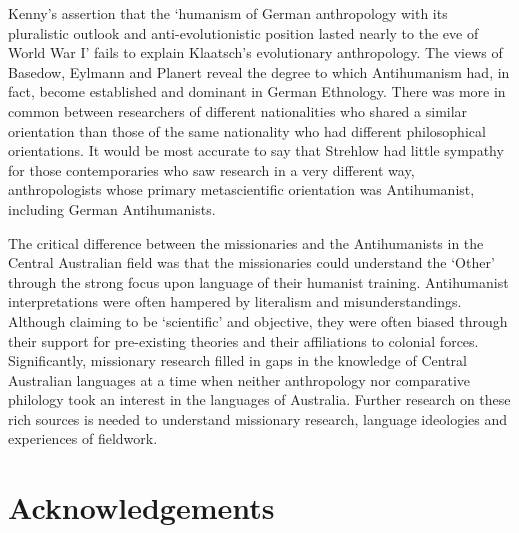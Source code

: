\documentclass[output=paper]{langsci/langscibook}
\begin{document}
Kenny’s assertion that the ‘humanism of German anthropology with its pluralistic outlook and anti-evolutionistic position lasted nearly to the eve of World War I’ fails to explain Klaatsch’s evolutionary anthropology. The views of Basedow, Eylmann and Planert reveal the degree to which Antihumanism had, in fact, become established and dominant in German Ethnology. There was more in common between researchers of different nationalities who shared a similar orientation than those of the same nationality who had different philosophical orientations.  It would be most accurate to say that Strehlow had little sympathy for those contemporaries who saw research in a very different way, anthropologists whose primary metascientific orientation was Antihumanist, including German Antihumanists. 

The critical difference between the missionaries and the Antihumanists in the Central Australian field was that the missionaries could understand the ‘Other’ through the strong focus upon language of their humanist training. Antihumanist interpretations were often hampered by literalism and misunderstandings. Although claiming to be ‘scientific’ and objective, they were often biased through their support for pre-existing theories and their affiliations to colonial forces. Significantly, missionary research filled in gaps in the knowledge of Central Australian languages at a time when neither anthropology nor comparative philology took an interest in the languages of Australia. Further research on these rich sources is needed to understand missionary research, language ideologies and experiences of fieldwork. 


\section*{Acknowledgements}


{\sloppy\printbibliography[heading=subbibliography,notkeyword=this]}
\end{document}
